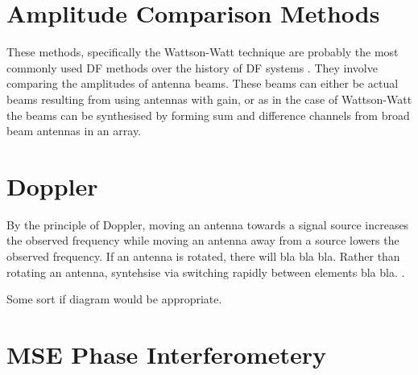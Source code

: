 \section{Amplitude Comparison Methods}
These methods, specifically the Wattson-Watt technique are probably the most commonly used DF methods over the history of DF systems \cite{poisel2012electronic}.
They involve comparing the amplitudes of antenna beams. These beams can either be actual beams resulting from using antennas with gain, or as in the case of Wattson-Watt the beams can be synthesised by forming sum and difference channels from broad beam antennas in an array.

\section{Doppler}
By the principle of Doppler, moving an antenna towards a signal source increases the observed frequency while moving an antenna away from a source lowers the observed frequency. If an antenna is rotated, there will bla bla bla.
Rather than rotating an antenna, syntehsise via switching rapidly between elements bla bla. \cite{poisel2012electronic}. 

Some sort if diagram would be appropriate.

\section{MSE Phase Interferometery} 


